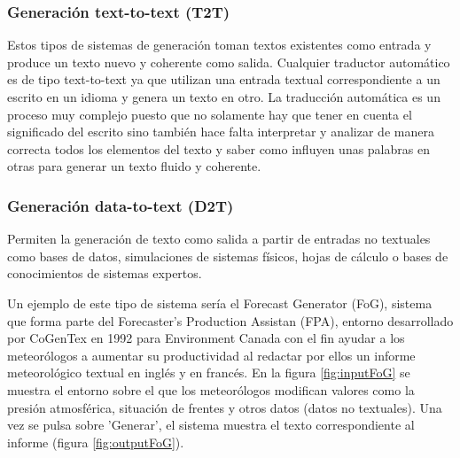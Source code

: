 \subsubsection{Generación text-to-text (T2T)}
Estos tipos de sistemas de generación toman textos existentes como entrada y produce un texto nuevo y coherente como salida.
Cualquier traductor automático es de tipo text-to-text ya que utilizan una entrada textual correspondiente a un escrito en un idioma y genera un texto en otro. La traducción automática es un proceso muy complejo puesto que no solamente hay que tener en cuenta el significado del escrito sino también hace falta interpretar y analizar de manera correcta todos los elementos del texto y saber como influyen unas palabras en otras para generar un texto fluido y coherente. 

\subsubsection{Generación data-to-text (D2T)}
Permiten la generación de texto como salida a partir de entradas no textuales como bases de datos, simulaciones de sistemas físicos, hojas de cálculo o bases de conocimientos de sistemas expertos.

Un ejemplo de este tipo de sistema sería el Forecast Generator (FoG), sistema que forma parte del Forecaster's Production Assistan (FPA), entorno desarrollado por CoGenTex en 1992 para Environment Canada con el fin ayudar a los meteorólogos a aumentar su productividad al redactar por ellos un informe meteorológico textual en inglés y en francés. En la figura  \ref{fig:inputFoG} se muestra el entorno sobre el que los meteorólogos modifican valores como la presión atmosférica, situación de frentes y otros datos (datos no textuales). Una vez se pulsa sobre 'Generar', el sistema muestra el texto correspondiente al informe (figura \ref{fig:outputFoG}). 


